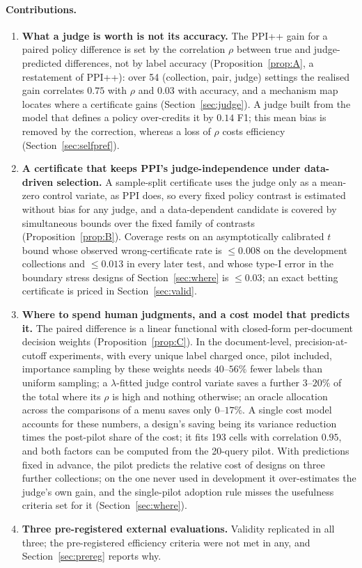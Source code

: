 \documentclass{article}
\begin{document}
\paragraph{Contributions.}
\begin{enumerate}
\item \textbf{What a judge is worth is not its accuracy.} The PPI++ gain for a paired policy difference is set by the correlation $\rho$ between true and judge-predicted differences, not by label accuracy (Proposition~\ref{prop:A}, a restatement of PPI++): over 54 (collection, pair, judge) settings the realised gain correlates $0.75$ with $\rho$ and $0.03$ with accuracy, and a mechanism map locates where a certificate gains (Section~\ref{sec:judge}). A judge built from the model that defines a policy over-credits it by $0.14$ F1; this mean bias is removed by the correction, whereas a loss of $\rho$ costs efficiency (Section~\ref{sec:selfpref}).
\item \textbf{A certificate that keeps PPI's judge-independence under data-driven selection.} A sample-split certificate uses the judge only as a mean-zero control variate, as PPI does, so every fixed policy contrast is estimated without bias for any judge, and a data-dependent candidate is covered by simultaneous bounds over the fixed family of contrasts (Proposition~\ref{prop:B}). Coverage rests on an asymptotically calibrated $t$ bound whose observed wrong-certificate rate is $\le0.008$ on the development collections and $\le0.013$ in every later test, and whose type-I error in the boundary stress designs of Section~\ref{sec:where} is $\le0.03$; an exact betting certificate is priced in Section~\ref{sec:valid}.
\item \textbf{Where to spend human judgments, and a cost model that predicts it.} The paired difference is a linear functional with closed-form per-document decision weights (Proposition~\ref{prop:C}). In the document-level, precision-at-cutoff experiments, with every unique label charged once, pilot included, importance sampling by these weights needs $40$--$56\%$ fewer labels than uniform sampling; a $\lambda$-fitted judge control variate saves a further $3$--$20\%$ of the total where its $\rho$ is high and nothing otherwise; an oracle allocation across the comparisons of a menu saves only $0$--$17\%$. A single cost model accounts for these numbers, a design's saving being its variance reduction times the post-pilot share of the cost; it fits 193 cells with correlation $0.95$, and both factors can be computed from the 20-query pilot. With predictions fixed in advance, the pilot predicts the relative cost of designs on three further collections; on the one never used in development it over-estimates the judge's own gain, and the single-pilot adoption rule misses the usefulness criteria set for it (Section~\ref{sec:where}).
\item \textbf{Three pre-registered external evaluations.} Validity replicated in all three; the pre-registered efficiency criteria were not met in any, and Section~\ref{sec:prereg} reports why.
\end{enumerate}
\end{document}
